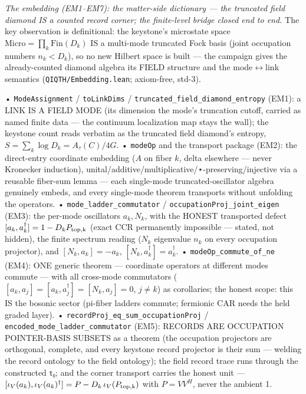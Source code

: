 \documentclass[11pt,a4paper]{article}
\begin{document}
\emph{The embedding (EM1--EM7): the matter-side dictionary — the truncated field diamond IS a counted record corner; the finite-level bridge closed end to end.} The key observation is definitional: the keystone's microstate space $\mathrm{Micro} = \prod_{k} \mathrm{Fin}(D_k)$ IS a multi-mode truncated Fock basis (joint occupation numbers $n_k < D_k$), so no new Hilbert space is built — the campaign gives the already-counted diamond algebra its FIELD structure and the mode$\leftrightarrow$link semantics (\texttt{QIQTH/Embedding.lean}; axiom-free, std-3).

  • \texttt{ModeAssignment} / \texttt{toLinkDims} / \texttt{truncated\_field\_diamond\_entropy} (EM1): a LINK IS A FIELD MODE (its dimension the mode's truncation cutoff, carried as named finite data — the continuum localization map stays the wall); the keystone count reads verbatim as the truncated field diamond's entropy, $S = \sum_k \log D_k = A_\tau(C)/4G$.
  • \texttt{modeOp} and the transport package (EM2): the direct-entry coordinate embedding ($A$ on fiber $k$, delta elsewhere — never Kronecker induction), unital/additive/multiplicative/⋆-preserving/injective via a reusable fiber-sum lemma — each single-mode truncated-oscillator algebra genuinely embeds, and every single-mode theorem transports without unfolding the operators.
  • \texttt{mode\_ladder\_commutator} / \texttt{occupationProj\_joint\_eigen} (EM3): the per-mode oscillators $a_k, N_k$, with the HONEST transported defect $[a_k, a_k^\dagger] = 1 - D_k P_{\rm top,k}$ (exact CCR permanently impossible — stated, not hidden), the finite spectrum reading ($N_k$ eigenvalue $n_k$ on every occupation projector), and $[N_k, a_k] = -a_k$, $[N_k, a_k^\dagger] = a_k^\dagger$.
  • \texttt{modeOp\_commute\_of\_ne} (EM4): ONE generic theorem — coordinate operators at different modes commute — with all cross-mode commutators ($[a_k,a_j] = [a_k,a_j^\dagger] = [N_k,a_j] = 0$, $j\neq k$) as corollaries; the honest scope: this IS the bosonic sector (pi-fiber ladders commute; fermionic CAR needs the held graded layer).
  • \texttt{recordProj\_eq\_sum\_occupationProj} / \texttt{encoded\_mode\_ladder\_commutator} (EM5): RECORDS ARE OCCUPATION POINTER-BASIS SUBSETS as a theorem (the occupation projectors are orthogonal, complete, and every keystone record projector is their sum — welding the record ontology to the field ontology); the field record trace runs through the constructed τ₀; and the corner transport carries the honest unit — $[\iota_V(a_k), \iota_V(a_k)^\dagger] = P - D_k\,\iota_V(P_{\rm top,k})$ with $P = VV^H$, never the ambient 1.
\end{document}
